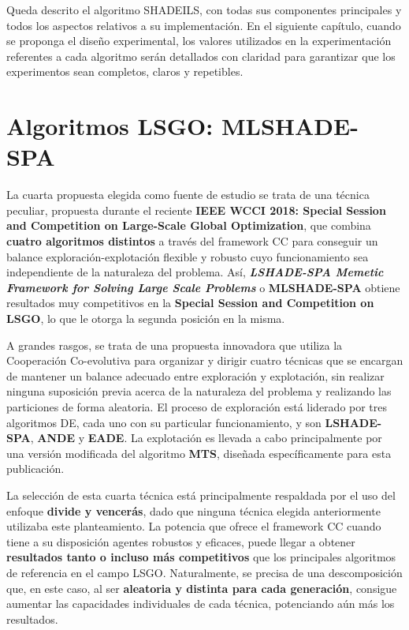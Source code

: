 Queda descrito el algoritmo SHADEILS, con todas sus componentes principales y todos los aspectos relativos a su implementación. En el siguiente capítulo, cuando se proponga el diseño experimental, los valores utilizados en la experimentación referentes a cada algoritmo serán detallados con claridad para garantizar que los experimentos sean completos, claros y repetibles. 

\section{Algoritmos LSGO: MLSHADE-SPA}

La cuarta propuesta elegida como fuente de estudio se trata de una técnica peculiar, propuesta durante el reciente \textbf{IEEE WCCI 2018: Special Session and Competition on Large-Scale Global Optimization}\cite{WCCI-SHADEILS}, que combina \textbf{cuatro algoritmos distintos} a través del framework CC\cite{CCoevo} para conseguir un balance exploración-explotación flexible y robusto cuyo funcionamiento sea independiente de la naturaleza del problema. Así, \textbf{\textit{LSHADE-SPA Memetic Framework for Solving Large Scale Problems}} o \textbf{MLSHADE-SPA}\cite{ML-SHADE-SPA} obtiene resultados muy competitivos en la \textbf{Special Session and Competition on LSGO}, lo que le otorga la segunda posición en la misma.

A grandes rasgos, se trata de una propuesta innovadora que utiliza la Cooperación Co-evolutiva\cite{CCoevo} para organizar y dirigir cuatro técnicas que se encargan de mantener un balance adecuado entre exploración y explotación, sin realizar ninguna suposición previa acerca de la naturaleza del problema y realizando las particiones de forma aleatoria. El proceso de exploración está liderado por tres algoritmos DE, cada uno con su particular funcionamiento, y son \textbf{LSHADE-SPA}\cite{LSHADESPA}, \textbf{ANDE}\cite{ANDE} y \textbf{EADE}\cite{EADE}. La explotación es llevada a cabo principalmente por una versión modificada del algoritmo \textbf{MTS}\cite{MTS-LSGO}, diseñada específicamente para esta publicación.

La selección de esta cuarta técnica está principalmente respaldada por el uso del enfoque \textbf{divide y vencerás}, dado que ninguna técnica elegida anteriormente utilizaba este planteamiento. La potencia que ofrece el framework CC\cite{CCoevo} cuando tiene a su disposición agentes robustos y eficaces, puede llegar a obtener \textbf{resultados tanto o incluso más competitivos} que los principales algoritmos de referencia en el campo LSGO. Naturalmente, se precisa de una descomposición que, en este caso, al ser \textbf{aleatoria y distinta para cada generación}, consigue aumentar las capacidades individuales de cada técnica, potenciando aún más los resultados.

